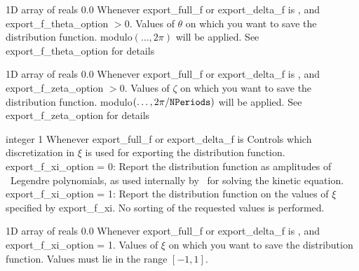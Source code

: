 \myhrule

{1D array of reals}
{0.0}
{Whenever {\ttfamily export\_full\_f} or {\ttfamily export\_delta\_f} is \true, and {\ttfamily export\_f\_theta\_option} $>0$.}
{Values of $\theta$ on which you want to save the distribution function.  modulo$(\ldots, 2\pi)$ will be applied.  See {\ttfamily export\_f\_theta\_option} for details}


\myhrule

{1D array of reals}
{0.0}
{Whenever {\ttfamily export\_full\_f} or {\ttfamily export\_delta\_f} is \true, and {\ttfamily export\_f\_zeta\_option} $>0$.}
{Values of $\zeta$ on which you want to save the distribution function.  modulo$(\ldots, 2\pi/\mbox{\ttfamily NPeriods})$ will be applied.  See {\ttfamily export\_f\_zeta\_option} for details}

\myhrule

{integer}
{1}
{Whenever {\ttfamily export\_full\_f} or {\ttfamily export\_delta\_f} is \true}
{Controls which discretization in $\xi$ is used for exporting the distribution function.\\

{\ttfamily export\_f\_xi\_option} = 0: Report the distribution function as amplitudes of \Nxi~Legendre polynomials, as used internally by \sfincs~for solving the kinetic equation.\\

{\ttfamily export\_f\_xi\_option} = 1: Report the distribution function on the values of $\xi$ specified by {\ttfamily export\_f\_xi}. No sorting of the requested values is performed.
}

\myhrule

{1D array of reals}
{0.0}
{Whenever {\ttfamily export\_full\_f} or {\ttfamily export\_delta\_f} is \true, and {\ttfamily export\_f\_xi\_option} = 1.}
{Values of $\xi$ on which you want to save the distribution function.  Values must lie in the range $[-1,1]$.}

\myhrule

